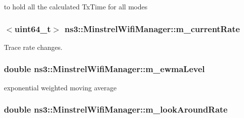 to hold all the calculated Tx\+Time for all modes 

\subsubsection[{\texorpdfstring{m\+\_\+current\+Rate}{m_currentRate}}]{$<$uint64\+\_\+t$>$ ns3\+::\+Minstrel\+Wifi\+Manager\+::m\+\_\+current\+Rate\hspace{0.3cm}{\ttfamily [private]}}\hypertarget{classns3_1_1MinstrelWifiManager_aba1b46b41de3b8b0b4279d0c5adad57e}{}\label{classns3_1_1MinstrelWifiManager_aba1b46b41de3b8b0b4279d0c5adad57e}


Trace rate changes. 

\subsubsection[{\texorpdfstring{m\+\_\+ewma\+Level}{m_ewmaLevel}}]{\setlength{\rightskip}{0pt plus 5cm}double ns3\+::\+Minstrel\+Wifi\+Manager\+::m\+\_\+ewma\+Level\hspace{0.3cm}{\ttfamily [private]}}\hypertarget{classns3_1_1MinstrelWifiManager_a528f4990b2e92f3b38ee1a4f764f0166}{}\label{classns3_1_1MinstrelWifiManager_a528f4990b2e92f3b38ee1a4f764f0166}


exponential weighted moving average 

\subsubsection[{\texorpdfstring{m\+\_\+look\+Around\+Rate}{m_lookAroundRate}}]{\setlength{\rightskip}{0pt plus 5cm}double ns3\+::\+Minstrel\+Wifi\+Manager\+::m\+\_\+look\+Around\+Rate\hspace{0.3cm}{\ttfamily [private]}}\hypertarget{classns3_1_1MinstrelWifiManager_aebf6e38fb43af62f59490829d46e0e1d}{}\label{classns3_1_1MinstrelWifiManager_aebf6e38fb43af62f59490829d46e0e1d}


